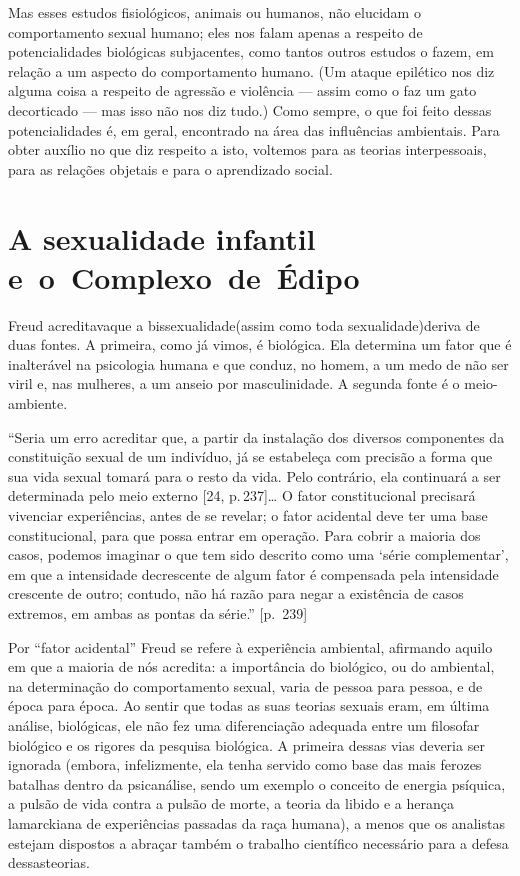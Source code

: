  Mas esses estudos fisiológicos, animais ou humanos, não elucidam o
comportamento sexual humano; eles nos falam apenas a respeito de
potencialidades biológicas subjacentes, como tantos outros estudos o
fazem, em relação a um aspecto do comportamento humano. (Um ataque
epilético nos diz alguma coisa a respeito de agressão e violência ---
assim como o faz um gato decorticado --- mas isso não nos diz tudo.)
Como sempre, o que foi feito dessas potencialidades é, em geral,
encontrado na área das influências ambientais. Para obter auxílio no
que diz respeito a isto, voltemos para as teorias interpessoais, para
as relações objetais e para o aprendizado social.

\section{A sexualidade infantil \mbox{e o Complexo de Édipo}}

Freud acreditava\idxbisseteor[|(] que a\idxconfe{} bissexualidade\idxsexui[|(] 
(assim como toda sexualidade)\idxinfansexua[|(]
deriva de duas fontes. A primeira, como já vimos, é biológica. Ela
determina um fator que é inalterável na psicologia humana e que conduz,
no homem, a um medo de não ser viril e, nas mulheres, a um anseio por
masculinidade. A segunda fonte é o meio-ambiente.

``Seria um erro acreditar que, a partir da instalação
dos diversos componentes da constituição sexual de um indivíduo, já se
estabeleça com precisão a forma que sua vida sexual tomará para o resto
da vida. Pelo contrário, ela continuará a ser determinada pelo meio
externo [24, p.\,237]\ldots{} O fator constitucional precisará vivenciar
experiências, antes de se revelar; o fator acidental deve ter uma base
constitucional, para que possa entrar em operação. Para cobrir a
maioria dos casos, podemos imaginar o que tem sido descrito como uma
`série complementar', em que a intensidade decrescente de algum fator
é compensada pela intensidade crescente de outro; contudo, não há razão
para negar a existência de casos extremos, em ambas as pontas da série.'' [p.~239]

Por ``fator acidental'' Freud\idxfreudinsti{} se refere à
experiência ambiental, afirmando aquilo em que a maioria de nós
acredita: a importância do biológico, ou do ambiental, na determinação
do comportamento sexual, varia de pessoa para pessoa, e de época para
época. Ao sentir que todas as suas teorias sexuais eram, em última
análise, biológicas, ele não fez uma diferenciação adequada entre um
filosofar biológico e os rigores da pesquisa biológica. A primeira
dessas vias deveria ser ignorada (embora, infelizmente, ela tenha
servido como base das mais ferozes batalhas dentro da psicanálise,
sendo um exemplo o conceito de energia psíquica,\idxenerg{} a pulsão de vida
contra a pulsão de morte, a teoria da libido\idxlibid{} e a herança lamarckiana de
experiências passadas da raça humana), a menos que os analistas estejam
dispostos a abraçar também o trabalho científico necessário para a
defesa dessas\idxfreudbiolo[|)] teorias.

